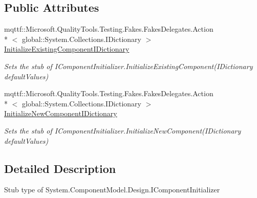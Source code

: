 \subsection*{Public Attributes}
\begin{DoxyCompactItemize}
\item 
mqttf\-::\-Microsoft.\-Quality\-Tools.\-Testing.\-Fakes.\-Fakes\-Delegates.\-Action\\*
$<$ global\-::\-System.\-Collections.\-I\-Dictionary $>$ \hyperlink{class_system_1_1_component_model_1_1_design_1_1_fakes_1_1_stub_i_component_initializer_aaea8ba2e277e0456bf85179896a57817}{Initialize\-Existing\-Component\-I\-Dictionary}
\begin{DoxyCompactList}\small\item\em Sets the stub of I\-Component\-Initializer.\-Initialize\-Existing\-Component(\-I\-Dictionary default\-Values)\end{DoxyCompactList}\item 
mqttf\-::\-Microsoft.\-Quality\-Tools.\-Testing.\-Fakes.\-Fakes\-Delegates.\-Action\\*
$<$ global\-::\-System.\-Collections.\-I\-Dictionary $>$ \hyperlink{class_system_1_1_component_model_1_1_design_1_1_fakes_1_1_stub_i_component_initializer_a7d216d809899aaa5624d4f4d1bb0061f}{Initialize\-New\-Component\-I\-Dictionary}
\begin{DoxyCompactList}\small\item\em Sets the stub of I\-Component\-Initializer.\-Initialize\-New\-Component(\-I\-Dictionary default\-Values)\end{DoxyCompactList}\end{DoxyCompactItemize}


\subsection{Detailed Description}
Stub type of System.\-Component\-Model.\-Design.\-I\-Component\-Initializer



